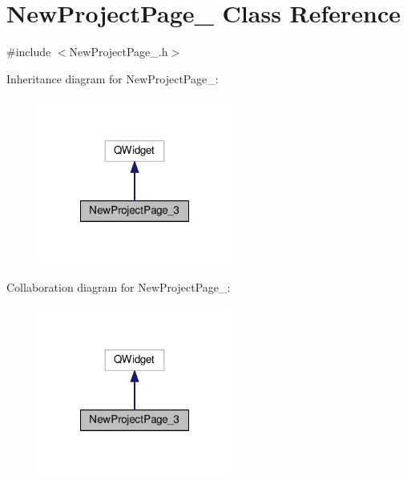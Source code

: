 \hypertarget{class_new_project_page__3}{\section{New\-Project\-Page\-\_ Class Reference}
\label{class_new_project_page__3}
}


{\ttfamily \#include $<$New\-Project\-Page\-\_.\-h$>$}



Inheritance diagram for New\-Project\-Page\-\_\-:\nopagebreak
\begin{figure}[H]
\begin{center}
\leavevmode
\includegraphics[width=180pt]{class_new_project_page__3__inherit__graph}
\end{center}
\end{figure}


Collaboration diagram for New\-Project\-Page\-\_\-:\nopagebreak
\begin{figure}[H]
\begin{center}
\leavevmode
\includegraphics[width=180pt]{class_new_project_page__3__coll__graph}
\end{center}
\end{figure}
